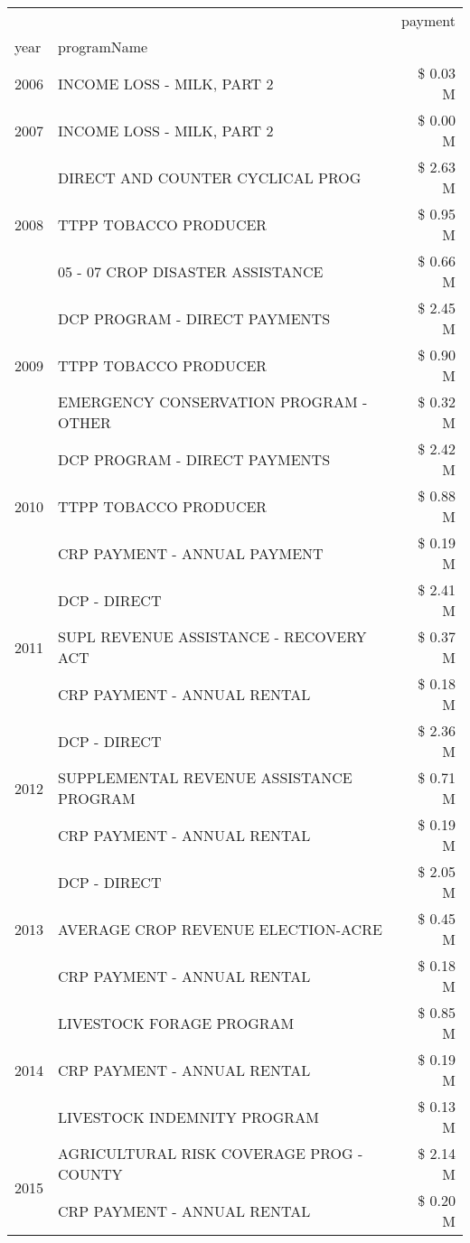 \begin{tabular}{llr}
\toprule
 &  & payment \\
year & programName &  \\
\midrule
2006 & INCOME LOSS - MILK, PART 2 & \$ 0.03 M \\
\cline{1-3}
2007 & INCOME LOSS - MILK, PART 2 & \$ 0.00 M \\
\cline{1-3}
\multirow[t]{3}{*}{2008} & DIRECT AND COUNTER CYCLICAL PROG & \$ 2.63 M \\
 & TTPP TOBACCO PRODUCER & \$ 0.95 M \\
 & 05 - 07 CROP DISASTER ASSISTANCE & \$ 0.66 M \\
\cline{1-3}
\multirow[t]{3}{*}{2009} & DCP PROGRAM - DIRECT PAYMENTS & \$ 2.45 M \\
 & TTPP TOBACCO PRODUCER & \$ 0.90 M \\
 & EMERGENCY CONSERVATION PROGRAM - OTHER & \$ 0.32 M \\
\cline{1-3}
\multirow[t]{3}{*}{2010} & DCP PROGRAM - DIRECT PAYMENTS & \$ 2.42 M \\
 & TTPP TOBACCO PRODUCER & \$ 0.88 M \\
 & CRP PAYMENT - ANNUAL PAYMENT & \$ 0.19 M \\
\cline{1-3}
\multirow[t]{3}{*}{2011} & DCP - DIRECT & \$ 2.41 M \\
 & SUPL REVENUE ASSISTANCE - RECOVERY ACT & \$ 0.37 M \\
 & CRP PAYMENT - ANNUAL RENTAL & \$ 0.18 M \\
\cline{1-3}
\multirow[t]{3}{*}{2012} & DCP - DIRECT & \$ 2.36 M \\
 & SUPPLEMENTAL REVENUE ASSISTANCE PROGRAM & \$ 0.71 M \\
 & CRP PAYMENT - ANNUAL RENTAL & \$ 0.19 M \\
\cline{1-3}
\multirow[t]{3}{*}{2013} & DCP - DIRECT & \$ 2.05 M \\
 & AVERAGE CROP REVENUE ELECTION-ACRE & \$ 0.45 M \\
 & CRP PAYMENT - ANNUAL RENTAL & \$ 0.18 M \\
\cline{1-3}
\multirow[t]{3}{*}{2014} & LIVESTOCK FORAGE PROGRAM & \$ 0.85 M \\
 & CRP PAYMENT - ANNUAL RENTAL & \$ 0.19 M \\
 & LIVESTOCK INDEMNITY PROGRAM & \$ 0.13 M \\
\cline{1-3}
\multirow[t]{3}{*}{2015} & AGRICULTURAL RISK COVERAGE PROG - COUNTY & \$ 2.14 M \\
 & CRP PAYMENT - ANNUAL RENTAL & \$ 0.20 M \\

\end{tabular}
